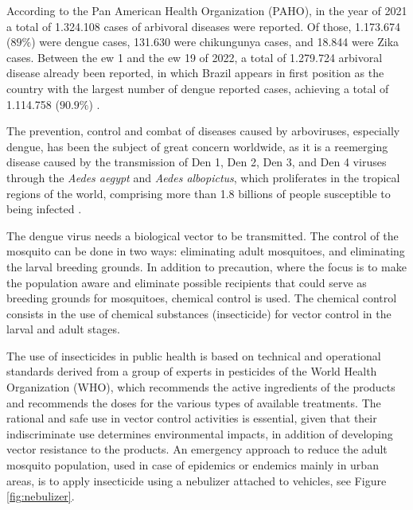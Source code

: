 \documentclass[a4paper,11pt]{article}
\begin{document}
According to the Pan American Health Organization  (PAHO), in the year of 2021 a
total  of  1.324.108  cases  of  arbivoral diseases  were  reported.  Of  those,
1.173.674 ($89\%$) were dengue cases, 131.630 were chikungunya cases, and 18.844
were Zika cases. Between the \gls{ew} 1 and  the \gls{ew} 19 of 2022, a total of
1.279.724 arbivoral  disease already been  reported, in which Brazil  appears in
first position as the country with  the largest number of dengue reported cases,
achieving a total of 1.114.758 ($90.9\%$) \citep{paho-1}.

The prevention, control and combat of diseases caused by arboviruses, especially
dengue, has been the  subject of great concern worldwide, as  it is a reemerging
disease caused  by the transmission of  Den 1, Den 2,  Den 3, and Den  4 viruses
through the {\em Aedes aegypt} and {\em Aedes albopictus}, which proliferates in
the tropical regions  of the world, comprising more than  1.8 billions of people
susceptible to being infected \citep{negreiros-2020}.

The dengue virus needs a biological vector to be transmitted. The control of the
mosquito can be done in two  ways: eliminating adult mosquitoes, and eliminating
the larval  breeding grounds. In addition  to precaution, where the  focus is to
make the population aware and eliminate  possible recipients that could serve as
breeding grounds for mosquitoes, chemical  control is used. The chemical control
consists in the  use of chemical substances (insecticide) for  vector control in
the larval and adult stages.

The use of  insecticides in public health is based  on technical and operational
standards derived  from a  group of  experts in pesticides  of the  World Health
Organization (WHO), which recommends the  active ingredients of the products and
recommends the doses for the various types of available treatments. The rational
and  safe use  in  vector  control activities  is  essential,  given that  their
indiscriminate use  determines environmental impacts, in  addition of developing
vector resistance  to the products.  An emergency  approach to reduce  the adult
mosquito  population, used  in case  of epidemics  or endemics  mainly in  urban
areas,  is to  apply insecticide  using a  nebulizer attached  to vehicles,  see
Figure \ref{fig:nebulizer}.
\end{document}
